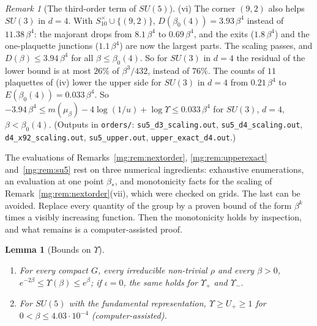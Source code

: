 \documentclass[11pt,a4paper]{article}
\newtheorem{lemma}[theorem]{Lemma}
\theoremstyle{definition}
\theoremstyle{remark}
\newtheorem{remark}[theorem]{Remark}
\begin{document}
\begin{remark}[The third-order term of $SU(5)$]
(vi) The corner $(9,2)$ also helps $SU(3)$ in $d=4$. With $S^\times_{10}\cup\{(9,2)\}$, $D(\beta_0(4))=3.93\,\beta^4$ instead of $11.38\,\beta^4$: the majorant drops from $8.1\,\beta^4$ to $0.69\,\beta^4$, and the exits
($1.8\,\beta^4$) and the one-plaquette junctions ($1.1\,\beta^4$) are now the largest parts. The scaling passes, and $D(\beta)\le3.94\,\beta^4$ for all $\beta\le\beta_0(4)$. So for $SU(3)$ in $d=4$ the residual of
the lower bound is at most $26\%$ of $\beta^3/432$, instead of $76\%$. The counts of $11$ plaquettes of (iv) lower the upper side for $SU(3)$ in $d=4$ from $0.21\,\beta^4$ to
$E(\beta_0(4))=0.033\,\beta^4$. So $-3.94\,\beta^4\le m(\mu_\beta)-4\log(1/u)+\log\Upsilon\le0.033\,\beta^4$ for $SU(3)$, $d=4$, $\beta<\beta_0(4)$. (Outputs in \texttt{orders/}:
\texttt{su5\_d3\_scaling.out}, \texttt{su5\_d4\_scaling.out}, \texttt{d4\_x92\_scaling.out}, \texttt{su5\_upper.out}, \texttt{upper\_exact\_d4.out}.)
\end{remark}

The evaluations of Remarks~\ref{mg:rem:nextorder}, \ref{mg:rem:upperexact} and~\ref{mg:rem:su5} rest on three numerical ingredients: exhaustive enumerations, an evaluation at one
point $\beta_*$, and monotonicity facts for the scaling of Remark~\ref{mg:rem:nextorder}(vii), which were checked on grids. The last can be avoided. Replace every quantity of the
group by a proven bound of the form $\beta^k$ times a visibly increasing function. Then the monotonicity holds by inspection, and what remains is a computer-assisted proof.

\begin{lemma}[Bounds on $\Upsilon$]\label{mg:lem:upsbounds}
\begin{enumerate}[label=(\roman*)]
\item For every compact $G$, every irreducible non-trivial $\rho$ and every $\beta>0$, $e^{-2\beta}\le\Upsilon(\beta)\le e^\beta$; if $\iota=0$, the same holds for $\Upsilon_+$ and
$\Upsilon_-$.
\item For $SU(5)$ with the fundamental representation, $\Upsilon\ge U_+\ge1$ for $0<\beta\le4.03\cdot10^{-4}$ (computer-assisted).
\end{enumerate}
\end{lemma}
\end{document}
